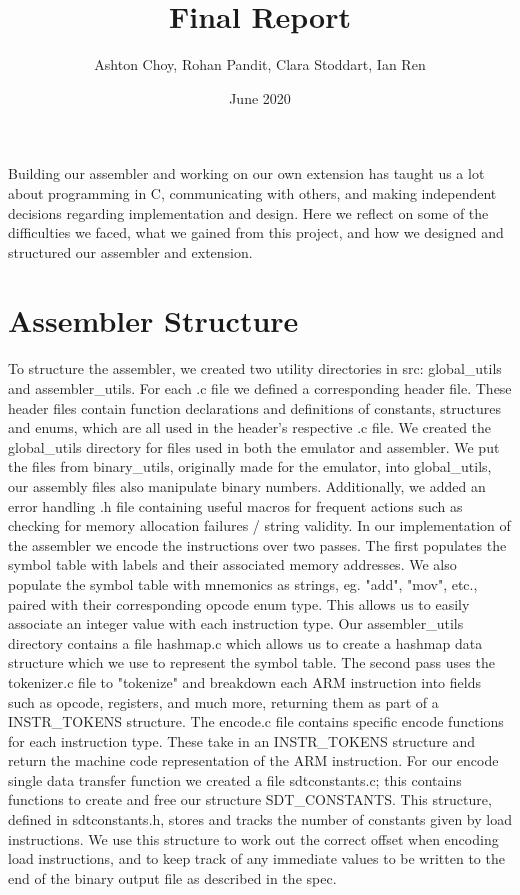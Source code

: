 \documentclass[11pt]{article}
\begin{document}
\title{Final Report}
\author{Ashton Choy, Rohan Pandit, Clara Stoddart, Ian Ren }
\date{June 2020}

\maketitle

Building our assembler and working on our own extension has taught us a lot about programming in C, communicating with others, and making independent decisions regarding implementation and design. Here we reflect on some of the difficulties we faced, what we gained from this project, and how we designed and structured our assembler and extension.

\section*{Assembler Structure}
To structure the assembler, we created two utility directories in src: global\_utils and assembler\_utils. For each .c file we defined a corresponding header file. These header files contain function declarations and definitions of constants, structures and enums, which are all used in the header's respective .c file.
We created the global\_utils directory for files used in both the emulator and assembler. We put the files from binary\_utils, originally made for the emulator, into global\_utils, our assembly files also manipulate binary numbers. Additionally, we added an error handling .h file containing useful macros for frequent actions such as checking for memory allocation failures / string validity. In our implementation of the assembler we encode the instructions over two passes. The first populates the symbol table with labels and their associated memory addresses. We also populate the symbol table with mnemonics as strings, eg. "add", "mov", etc.,  paired with their corresponding opcode enum type. This allows us to easily associate an integer value with each instruction type. Our assembler\_utils directory contains a file hashmap.c which allows us to create a hashmap data structure which we use to represent the symbol table. The second pass uses the tokenizer.c file to "tokenize" and breakdown each ARM instruction into fields such as opcode, registers, and much more, returning them as part of a INSTR\_TOKENS structure. The encode.c file contains specific encode functions for each instruction type. These take in an INSTR\_TOKENS structure and return the machine code representation of the ARM instruction. For our encode single data transfer function we created a file sdtconstants.c; this contains functions to create and free our structure SDT\_CONSTANTS. This structure, defined in sdtconstants.h, stores and tracks the number of constants given by load instructions. We use this structure to work out the correct offset when encoding load instructions, and to keep track of any immediate values to be written to the end of the binary output file as described in the spec.
\end{document}
